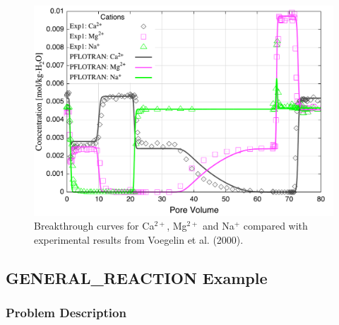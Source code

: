 \begin{figure}[h]\centering
\includegraphics[scale=0.5]{./figs/ionex}
\caption{Breakthrough curves for Ca$^{2+}$, Mg$^{2+}$ and Na$^+$ compared with experimental results from Voegelin et al. (2000).}\label{fionex}
\end{figure}

\newpage
\scriptsize
{}\label{tionex}
\normalsize

\newpage

\subsection{GENERAL\_REACTION Example}

\subsubsection{Problem Description}


